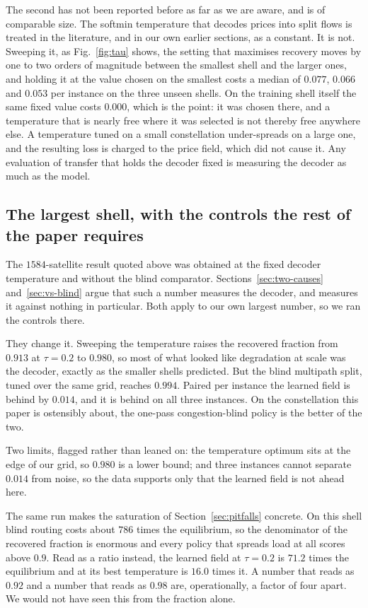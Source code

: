 \documentclass[journal]{IEEEtran}
\begin{document}
The second has not been reported before as far as we are aware, and is of comparable size. The
softmin temperature that decodes prices into split flows is treated in the literature, and in our
own earlier sections, as a constant. It is not. Sweeping it, as Fig.~\ref{fig:tau} shows, the
setting that maximises recovery
moves by one to two orders of magnitude between the smallest shell and the larger ones, and holding
it at the value chosen on the smallest costs a median of $0.077$, $0.066$ and $0.053$ per instance
on the three unseen shells. On the training shell itself the same fixed value costs $0.000$, which
is the point: it was chosen there, and a temperature that is nearly free where it was selected is
not thereby free anywhere else. A temperature tuned on a small constellation under-spreads on a large
one, and the resulting loss is charged to the price field, which did not cause it. Any evaluation
of transfer that holds the decoder fixed is measuring the decoder as much as the model.

\subsection{The largest shell, with the controls the rest of the paper requires}\label{sec:s1584}
The $1584$-satellite result quoted above was obtained at the fixed decoder temperature and
without the blind comparator. Sections~\ref{sec:two-causes} and~\ref{sec:vs-blind} argue that such
a number measures the decoder, and measures it against nothing in particular. Both apply to our own
largest number, so we ran the controls there.

They change it. Sweeping the temperature raises the recovered fraction from $0.913$ at $\tau=0.2$ to $0.980$, so most of what looked like degradation at scale was the decoder, exactly as the smaller
shells predicted. But the blind multipath split, tuned over the same grid, reaches $0.994$. Paired per instance the learned field is behind by $0.014$, and it is behind on all three instances. On the
constellation this paper is ostensibly about, the one-pass congestion-blind policy is the better of
the two.

Two limits, flagged rather than leaned on: the temperature optimum sits at the edge of our grid, so $0.980$ is a lower bound; and three instances cannot separate $0.014$ from noise, so the data supports only that the learned field is not ahead here.

The same run makes the saturation of Section~\ref{sec:pitfalls} concrete. On this shell blind routing costs about $786$ times the equilibrium, so the denominator of the recovered fraction is
enormous and every policy that spreads load at all scores above $0.9$. Read as a ratio instead, the
learned field at $\tau=0.2$ is $71.2$ times the equilibrium and at its best temperature is $16.0$ times it. A number that reads as $0.92$ and a number that reads as $0.98$ are, operationally, a
factor of four apart. We would not have seen this from the fraction alone.
\end{document}
